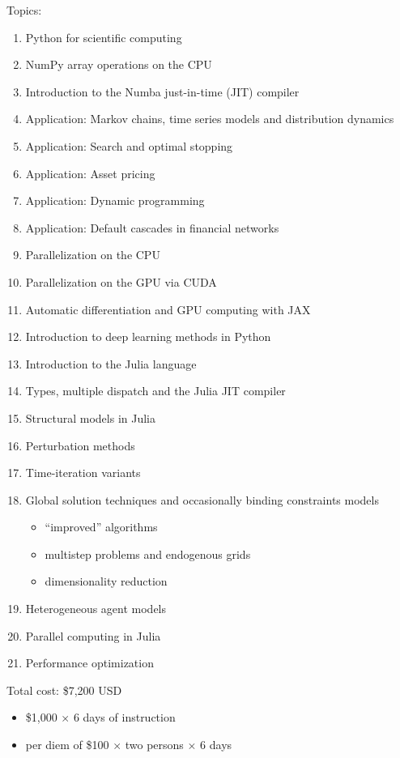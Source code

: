 \documentclass[12pt]{article}
\begin{document}
Topics:
%
\begin{enumerate}
    \item Python for scientific computing
    \item NumPy array operations on the CPU
    \item Introduction to the Numba just-in-time (JIT) compiler
    \item Application: Markov chains, time series models and distribution dynamics
    \item Application: Search and optimal stopping
    \item Application: Asset pricing
    \item Application: Dynamic programming
    \item Application: Default cascades in financial networks
    \item Parallelization on the CPU
    \item Parallelization on the GPU via CUDA
    \item Automatic differentiation and GPU computing with JAX
    \item Introduction to deep learning methods in Python
    \item Introduction to the Julia language
    \item Types, multiple dispatch and the Julia JIT compiler
    \item Structural models in Julia
    \item Perturbation methods
    \item Time-iteration variants
    \item Global solution techniques and occasionally binding constraints models
    \begin{itemize}
        \item ``improved'' algorithms
        \item multistep problems and endogenous grids
        \item dimensionality reduction
    \end{itemize}
    \item Heterogeneous agent models
    \item Parallel computing in Julia
    \item Performance optimization
\end{enumerate}

Total cost: \$7,200 USD 

\begin{itemize}
    \item \$1,000 $\times$ 6 days of instruction 
    \item per diem of \$100 $\times$ two persons $\times$ 6 days
\end{itemize}
\end{document}
